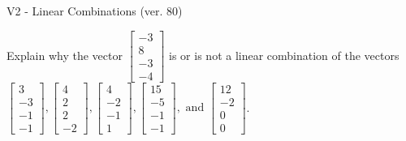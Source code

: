 \begin{exercise}
  \begin{exerciseTitle}V2 - Linear Combinations (ver. 80)\end{exerciseTitle}
  \begin{exerciseStatement}
    Explain why the vector \(\left[\begin{array}{c}
-3 \\
8 \\
-3 \\
-4
\end{array}\right]\)  is or is not a linear 
	combination of the vectors \(\left[\begin{array}{c}
3 \\
-3 \\
-1 \\
-1
\end{array}\right] , \left[\begin{array}{c}
4 \\
2 \\
2 \\
-2
\end{array}\right] , \left[\begin{array}{c}
4 \\
-2 \\
-1 \\
1
\end{array}\right] , \left[\begin{array}{c}
15 \\
-5 \\
-1 \\
-1
\end{array}\right] , \text{ and } \left[\begin{array}{c}
12 \\
-2 \\
0 \\
0
\end{array}\right]\).
	



\end{exerciseStatement}
\end{exercise}

